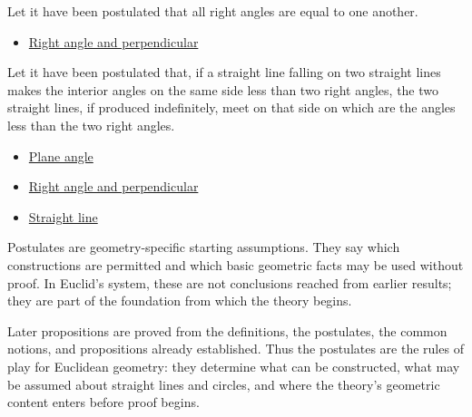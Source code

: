 \begin{axiom}
\label{ax-euclid-postulate-right-angles-equal}
Let it have been postulated that all right angles are equal to one another.
\end{axiom}
\begin{lra-not-visible}
\begin{dependencies}
\begin{itemize}
  \item \hyperref[def-euclid-right-angle-and-perpendicular]{Right angle and perpendicular}
\end{itemize}
\end{dependencies}
\end{lra-not-visible}

\begin{axiom}
\label{ax-euclid-postulate-parallel}
Let it have been postulated that, if a straight line falling on two straight
lines makes the interior angles on the same side less than two right angles,
the two straight lines, if produced indefinitely, meet on that side on which are
the angles less than the two right angles.
\end{axiom}
\begin{lra-not-visible}
\begin{dependencies}
\begin{itemize}
  \item \hyperref[def-euclid-plane-angle]{Plane angle}
  \item \hyperref[def-euclid-right-angle-and-perpendicular]{Right angle and perpendicular}
  \item \hyperref[def-euclid-straight-line]{Straight line}
\end{itemize}
\end{dependencies}
\end{lra-not-visible}

\begin{remark*}[Exposition]
Postulates are geometry-specific starting assumptions. They say which
constructions are permitted and which basic geometric facts may be used without
proof. In Euclid's system, these are not conclusions reached from earlier
results; they are part of the foundation from which the theory begins.

Later propositions are proved from the definitions, the postulates, the common
notions, and propositions already established. Thus the postulates are the
rules of play for Euclidean geometry: they determine what can be constructed,
what may be assumed about straight lines and circles, and where the theory's
geometric content enters before proof begins.
\end{remark*}
